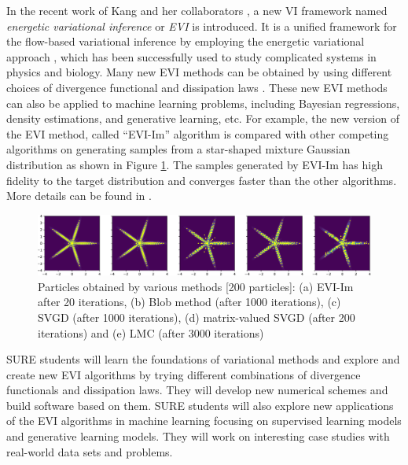 In the recent work of Kang and her collaborators \cite{wang2021particle}, a new VI framework named \emph{energetic variational inference} or \emph{EVI} is introduced. 
It is a unified framework for the flow-based variational inference by employing the energetic variational approach \cite{liu2020variational},  which has been successfully used to study complicated systems in physics and biology.
Many new EVI methods can be obtained by using different choices of divergence functional \cite{amari2012differential} and dissipation laws \cite{liu2020variational}.
These new EVI methods can also be applied to machine learning problems, including Bayesian regressions, density estimations, and generative learning, etc. 
For example, the new version of the EVI method, called ``EVI-Im'' algorithm is compared with other competing algorithms on generating samples from a star-shaped mixture Gaussian distribution as shown in Figure \ref{fig:star}. 
The samples generated by EVI-Im has high fidelity to the target distribution and converges faster than the other algorithms. More details can be found in \cite{wang2021particle}. 
\begin{figure}[htbp]
\centering
\includegraphics[width=\linewidth]{Star_compare}
\caption{ Particles obtained by various methods [200 particles]: (a) EVI-Im after 20 iterations, (b) Blob method (after 1000 iterations), (c) SVGD (after 1000 iterations), (d) matrix-valued SVGD (after 200 iterations) and (e) LMC (after 3000 iterations)}\label{fig:star}
\end{figure}

SURE students will learn the foundations of variational methods and explore  and create new EVI algorithms by trying different combinations of divergence functionals and dissipation laws. 
They will develop new numerical schemes and build software based on them. 
SURE students will also explore new applications of the EVI algorithms in machine learning focusing on supervised learning models and generative learning models. 
They will work on interesting case studies with real-world data sets and problems. 
